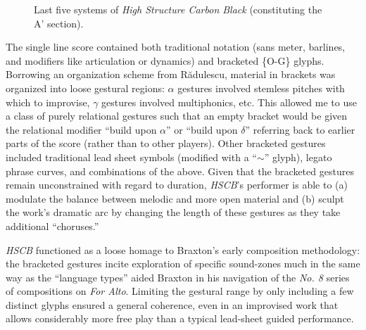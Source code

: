         \begin{figure}
            \centering
            \captionsetup{width=.5\textwidth}
            \caption{Last five systems of \textit{High Structure Carbon Black} (constituting the A' section).}
            \label{fig:hscbexcerpt}
        \end{figure}

    \noindent The single line score contained both traditional notation (sans meter, barlines, and modifiers like articulation or dynamics) and bracketed \{O-G\} glyphs. Borrowing an organization scheme from R\u{a}dulescu, material in brackets was organized into loose gestural regions: $\alpha$ gestures involved stemless pitches with which to improvise, $\gamma$ gestures involved multiphonics, etc. This allowed me to use a class of purely relational gestures such that an empty bracket would be given the relational modifier ``build upon $\alpha$'' or ``build upon $\delta$'' referring back to earlier parts of the score (rather than to other players). Other bracketed gestures included traditional lead sheet symbols (modified with a ``$\sim$'' glyph), legato phrase curves, and combinations of the above. Given that the bracketed gestures remain unconstrained with regard to duration, \textit{HSCB}'s performer is able to (a) modulate the balance between melodic and more open material and (b) sculpt the work's dramatic arc by changing the length of these gestures as they take additional ``choruses.''

    \textit{HSCB} functioned as a loose homage to Braxton's early composition methodology: the bracketed gestures incite exploration of specific sound-zones much in the same way as the ``language types'' aided Braxton in his navigation of the \textit{No. 8} series of compositions on \textit{For Alto}. Limiting the gestural range by only including a few distinct glyphs ensured a general coherence, even in an improvised work that allows considerably more free play than a typical lead-sheet guided performance. 

